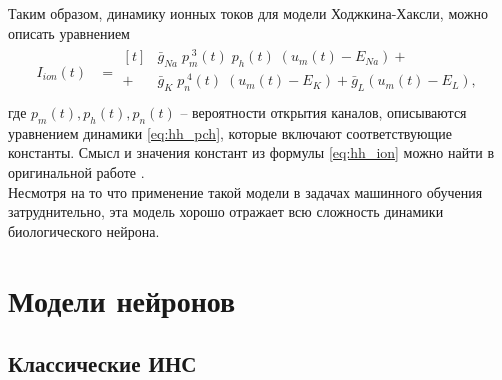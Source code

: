 \documentclass[a4paper,10pt]{article}
\begin{document}
	\indent Таким образом, динамику ионных токов для модели Ходжкина-Хаксли, можно описать уравнением
	\begin{align}\label{eq:hh_ion}
	I_{ion}(t) &= \begin{aligned}[t]
	&\bar{g}_{Na}\;p_{m}^{\;3}(t)\;p_{h}(t)\;(u_{m}(t)-E_{Na}) +	\\
	+\;&\bar{g}_{K}\;p_{n}^{\;4}(t)\;(u_{m}(t)-E_{K})+\bar{g}_{L}(u_{m}(t)-E_{L}),	\\
	\end{aligned}	
	\end{align}
	где $p_{m}(t), p_{h}(t), p_{n}(t)$ -- вероятности открытия каналов, описываются уравнением динамики \eqref{eq:hh_pch}, которые включают соответствующие константы. Смысл и значения констант из формулы \eqref{eq:hh_ion} можно найти в оригинальной работе \cite{HH}.\\
	\indent Несмотря на то что применение такой модели в задачах машинного обучения затруднительно, эта модель хорошо отражает всю сложность динамики биологического нейрона.

\section{Модели нейронов}
\subsection{Классические ИНС}
\end{document}
